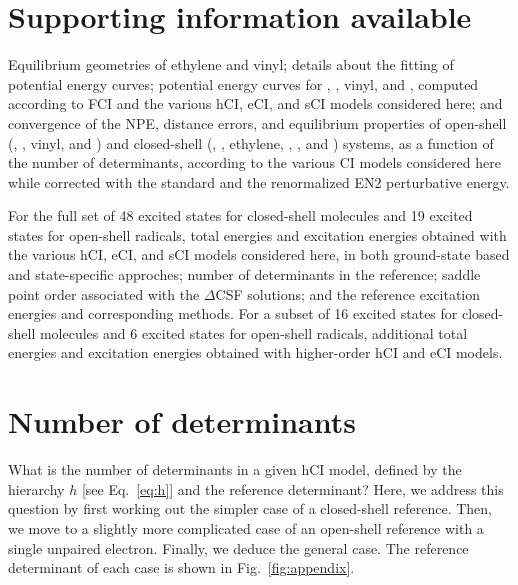 \documentclass[aip,jcp,reprint,noshowkeys,superscriptaddress]{revtex4-1}
\begin{document}
\section*{Supporting information available}
\label{sec:SI}

Equilibrium geometries of ethylene and vinyl; details about the fitting of potential energy curves;
potential energy curves for , , vinyl, and ,
computed according to FCI and the various hCI, eCI, and sCI models considered here;
and convergence of the NPE, distance errors, and equilibrium properties of
open-shell (, , vinyl, and )
and closed-shell (, , ethylene, , , and ) systems,
as a function of the number of determinants, according to the various CI models considered here while
corrected with the standard and the renormalized EN2 perturbative energy.

For the full set of 48 excited states for closed-shell molecules and 19 excited states for open-shell radicals,
total energies and excitation energies obtained with
the various hCI, eCI, and sCI models considered here, in both ground-state based and state-specific approches;
number of determinants in the reference; saddle point order associated with the $\Delta$CSF solutions;
and the reference excitation energies and corresponding methods.
For a subset of 16 excited states for closed-shell molecules and 6 excited states for open-shell radicals,
additional total energies and excitation energies obtained with higher-order hCI and eCI models.



\appendix

\section{Number of determinants}
\label{app:appendix}

What is the number of determinants in a given hCI model, defined by the hierarchy $h$ [see Eq.~\eqref{eq:h}] and the reference determinant?
Here, we address this question by first working out the simpler case of a closed-shell reference.
Then, we move to a slightly more complicated case of an open-shell reference with a single unpaired electron.
Finally, we deduce the general case.
The reference determinant of each case is shown in Fig.~\ref{fig:appendix}.
\end{document}
